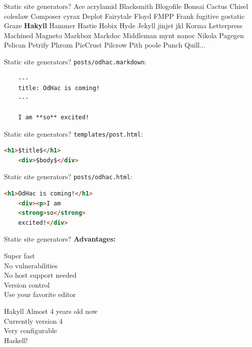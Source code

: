 \documentclass[20pt]{beamer}
\newcommand{\vspaced}{
    \vspace{5mm}
}
\begin{document}
\begin{frame}{Static site generators?}
    \small{
    Ace acrylamid Blacksmith Blogofile Bonsai Cactus Chisel coleslaw
    Composer cyrax Deplot Fairytale Floyd FMPP Frank fugitive gostatic Graze
    \textbf{Hakyll} Hammer Hastie Hobix Hyde Jekyll jinjet jkl Korma Letterpress
    Machined Magneto Markbox Markdoc Middleman mynt nanoc Nikola Pagegen
    Pelican Petrify Phrozn PieCrust Pilcrow Pith poole Punch Quill...
    }
\end{frame}

\begin{frame}[fragile]{Static site generators?}
    \texttt{posts/odhac.markdown}:
    \vspaced
    \begin{lstlisting}
    ---
    title: OdHac is coming!
    ---

    I am **so** excited!
    \end{lstlisting}
\end{frame}

\begin{frame}[fragile]{Static site generators?}
    \texttt{templates/post.html}:
    \vspaced
    \begin{lstlisting}[language=HTML]
    <h1>$title$</h1>
    <div>$body$</div>
    \end{lstlisting}
\end{frame}

\begin{frame}[fragile]{Static site generators?}
    \texttt{posts/odhac.html}:
    \vspaced
    \begin{lstlisting}[language=HTML]
    <h1>OdHac is coming!</h1>
    <div><p>I am
    <strong>so</strong>
    excited!</div>
    \end{lstlisting}
\end{frame}

\begin{frame}{Static site generators?}
    \textbf{Advantages:} \\
    \vspaced
    Super fast \\
    No vulnerabilities \\
    No host support needed \\
    Version control \\
    Use your favorite editor \\
\end{frame}


\begin{frame}{Hakyll}
    Almost 4 years old now \\
    Currently version 4 \\
    Very configurable \\
    Haskell! \\
\end{frame}
\end{document}
